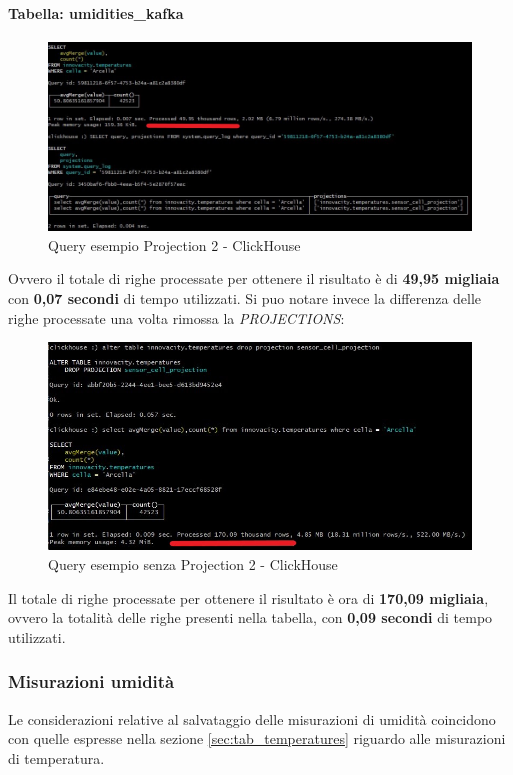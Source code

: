 \paragraph{Tabella: umidities\_kafka}
\begin{figure}[H]
    \centering
    \includegraphics[width=1\textwidth]{../Images/SpecificaTecnica/query2ProjectionsWith.jpg}
    \caption{Query esempio Projection 2 - ClickHouse}
    \label{fig:with2proj}
  \end{figure}
Ovvero il totale di righe processate per ottenere il risultato è di \textbf{49,95 migliaia} con \textbf{0,07 secondi} di tempo utilizzati.
Si puo notare invece la differenza delle righe processate una volta rimossa la \textit{PROJECTIONS}:
\begin{figure}[H]
    \centering
    \includegraphics[width=1\textwidth]{../Images/SpecificaTecnica/query2ProjectionsWithout.jpg}
    \caption{Query esempio senza Projection 2 - ClickHouse}
    \label{fig:without2proj}
  \end{figure}

 Il totale di righe processate per ottenere il risultato è ora di \textbf{170,09 migliaia}, ovvero la totalità delle righe presenti nella tabella, con \textbf{0,09 secondi} di tempo utilizzati.
\subsubsection{Misurazioni umidità}
Le considerazioni relative al salvataggio delle misurazioni di umidità coincidono con quelle espresse nella sezione \ref{sec:tab_temperatures} riguardo alle misurazioni di temperatura.

